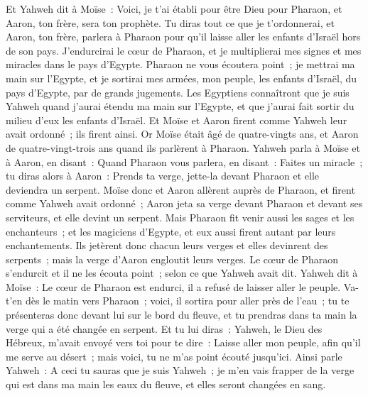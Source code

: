 \begin{multicols}{2}
\VerseOne{}Et Yahweh dit à Moïse~: Voici, je t'ai établi pour être Dieu pour Pharaon, et Aaron, ton frère, sera ton prophète.
Tu diras tout ce que je t'ordonnerai, et Aaron, ton frère, parlera à Pharaon pour qu'il laisse aller les enfants d'Israël hors de son pays.
J'endurcirai le cœur de Pharaon, et je multiplierai mes signes et mes miracles dans le pays d'Egypte.
Pharaon ne vous écoutera point~; je mettrai ma main sur l'Egypte, et je sortirai mes armées, mon peuple, les enfants d'Israël, du pays d'Egypte, par de grands jugements.
Les Egyptiens connaîtront que je suis Yahweh quand j'aurai étendu ma main sur l'Egypte, et que j'aurai fait sortir du milieu d'eux les enfants d'Israël.
Et Moïse et Aaron firent comme Yahweh leur avait ordonné~; ils firent ainsi.
Or Moïse était âgé de quatre-vingts ans, et Aaron de quatre-vingt-trois ans quand ils parlèrent à Pharaon.
Yahweh parla à Moïse et à Aaron, en disant~:
Quand Pharaon vous parlera, en disant~: Faites un miracle~; tu diras alors à Aaron~: Prends ta verge, jette-la devant Pharaon et elle deviendra un serpent.
Moïse donc et Aaron allèrent auprès de Pharaon, et firent comme Yahweh avait ordonné~; Aaron jeta sa verge devant Pharaon et devant ses serviteurs, et elle devint un serpent.
Mais Pharaon fit venir aussi les sages et les enchanteurs~; et les magiciens d'Egypte, et eux aussi firent autant par leurs enchantements.
Ils jetèrent donc chacun leurs verges et elles devinrent des serpents~; mais la verge d'Aaron engloutit leurs verges.
Le cœur de Pharaon s'endurcit et il ne les écouta point~; selon ce que Yahweh avait dit.
Yahweh dit à Moïse~: Le cœur de Pharaon est endurci, il a refusé de laisser aller le peuple.
Va-t'en dès le matin vers Pharaon~; voici, il sortira pour aller près de l'eau~; tu te présenteras donc devant lui sur le bord du fleuve, et tu prendras dans ta main la verge qui a été changée en serpent.
Et tu lui diras~: Yahweh, le Dieu des Hébreux, m'avait envoyé vers toi pour te dire~: Laisse aller mon peuple, afin qu'il me serve au désert~; mais voici, tu ne m'as point écouté jusqu'ici.
Ainsi parle Yahweh~: A ceci tu sauras que je suis Yahweh~; je m'en vais frapper de la verge qui est dans ma main les eaux du fleuve, et elles seront changées en sang.

\end{multicols}
